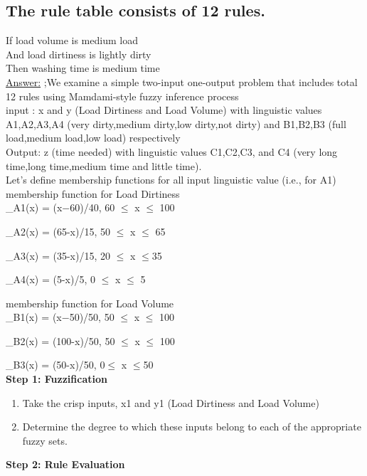 \documentclass[15pt,journal]{IEEEtran}
\begin{document}
\subsection{The rule table consists of 12 rules.}

If	load volume 	is	medium load\\
And	load dirtiness	is	lightly dirty\\
Then	washing time	is	medium time\\

\underline{Answer:} 
;We examine a simple two-input one-output
problem that includes total 12 rules using Mamdami-style
fuzzy inference process\\
input : x and y (Load Dirtiness and Load Volume) with
linguistic values A1,A2,A3,A4 (very dirty,medium dirty,low
dirty,not dirty) and B1,B2,B3 (full load,medium load,low
load) respectively\\
Output: z (time needed) with linguistic values C1,C2,C3,
and C4 (very long time,long time,medium time and little
time).\\
Let’s define membership functions for all input linguistic
value (i.e., for A1)
membership function for Load Dirtiness\\
 \mu_{A1(x)} = (x−60)/40, 60 $\leq$ x $\leq$ 100
  

   \mu_{A2(x)} = (65-x)/15, 50 $\leq$ x $\leq$ 65
   

   \mu_{A3(x)} = (35-x)/15, 20 $\leq$ x $\leq$35
   

   \mu_{A4(x)} = (5-x)/5, 0 $\leq$ x $\leq$ 5

membership function for Load Volume\\
 \mu_{B1(x)} = (x−50)/50, 50 $\leq$ x $\leq$ 100
  

   \mu_{B2(x)} = (100-x)/50, 50 $\leq$ x $\leq$ 100
   

   \mu_{B3(x)} = (50-x)/50, 0$\leq$ x $\leq$50\\%
   
  
\textbf{Step 1: Fuzzification}\\

\begin{enumerate}
    \item Take the crisp inputs, x1 and y1 (Load Dirtiness and Load Volume)
    \item Determine the degree to which these inputs belong to each of the appropriate fuzzy sets.
\end{enumerate}
   
\textbf{Step 2: Rule Evaluation }\\
\end{document}
